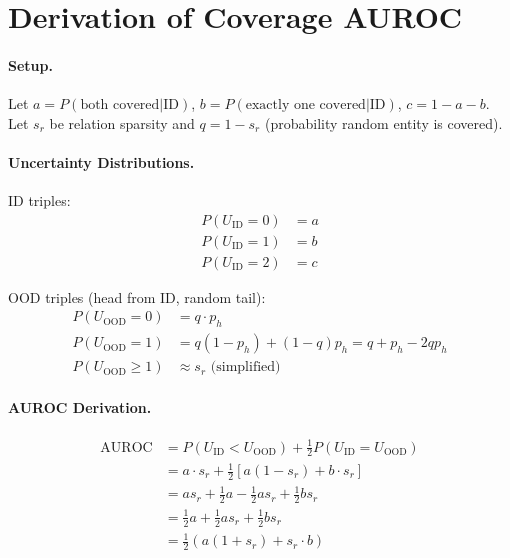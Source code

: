 
\section{Derivation of Coverage AUROC}
\label{app:proof}

\paragraph{Setup.}
Let $a = P(\text{both covered} | \text{ID})$, $b = P(\text{exactly one covered} | \text{ID})$, $c = 1 - a - b$.
Let $s_r$ be relation sparsity and $q = 1 - s_r$ (probability random entity is covered).

\paragraph{Uncertainty Distributions.}

ID triples:
\begin{align}
    P(U_{\text{ID}} = 0) &= a \\
    P(U_{\text{ID}} = 1) &= b \\
    P(U_{\text{ID}} = 2) &= c
\end{align}

OOD triples (head from ID, random tail):
\begin{align}
    P(U_{\text{OOD}} = 0) &= q \cdot p_h \\
    P(U_{\text{OOD}} = 1) &= q(1-p_h) + (1-q)p_h = q + p_h - 2qp_h \\
    P(U_{\text{OOD}} \geq 1) &\approx s_r \text{ (simplified)}
\end{align}

\paragraph{AUROC Derivation.}

\begin{align}
    \text{AUROC} &= P(U_{\text{ID}} < U_{\text{OOD}}) + \frac{1}{2}P(U_{\text{ID}} = U_{\text{OOD}}) \\
    &= a \cdot s_r + \frac{1}{2}[a(1-s_r) + b \cdot s_r] \\
    &= as_r + \frac{1}{2}a - \frac{1}{2}as_r + \frac{1}{2}bs_r \\
    &= \frac{1}{2}a + \frac{1}{2}as_r + \frac{1}{2}bs_r \\
    &= \frac{1}{2}(a(1+s_r) + s_r \cdot b)
\end{align}

